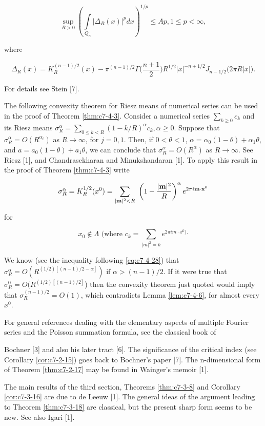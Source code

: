\[
\sup_{R>0}\left(\int\limits_{Q_{n}}\left|\Delta_{R}(x)\right|^{p} dx\right)^{1/p}\leq A p,1\leq p<\infty,
\]

where

\[
\Delta_{R}(x)=K_{R}^{(n-1)/2}(x)-\pi^{(n-1)/2}\Gamma\biggl(\frac{n+1}{2}\biggr)R^{1/2}\big|x\big|^{-n+1/2}J_{n-1/2}(2\pi R|x|\big).
\]

For details see Stein [7].

 The following convexity theorem for Riesz means of numerical series can be used in the proof of Theorem \ref{thm:c7-4-3}. Consider a numerical series $\sum_{k \geq 0} c_k$ and its Riesz means $\sigma_R^\alpha = \sum_{0 \leq k < R} (1 - k/R)^\alpha c_k, \alpha \geq 0$. Suppose that $\sigma_R^\alpha = O(R^{\alpha_t})$ as $R \to \infty$, for $j = 0, 1$. Then, if $0 < \theta < 1$, $\alpha = \alpha_0(1 - \theta) + \alpha_1\theta$, and $a = a_0(1 - \theta) + a_1\theta$, we can conclude that $\sigma_R^\alpha = O(R^\alpha)$ as $R \to \infty$. See Riesz [1], and Chandrasekharan and Minukshandaran [1]. To apply this result in the proof of Theorem \ref{thm:c7-4-3} write

\[
\sigma_{R}^{\alpha}=K_{R}^{1/2}(x^{0})=\sum_{|{\bf m}|^{2}<R}\ \left(1-\frac{|{\bf m}|^{2}}{R}\right)^{\alpha}e^{2\pi i{\bf m}\cdot{\bf x}^{0}}
\]

for

\[
x_{0}\notin\Lambda\text{ (where }c_{k}=\sum_{|m|^{2}=k}e^{2\pi i m\cdot x^{0}).}
\]

We know (see the inequality following \eqref{eq:c7-4-28}) that $\sigma_R^\alpha = O(R^{(1/2)[(n-1)/2-\alpha]})$ if $\alpha > (n-1)/2$. If it were true that $\sigma_R^0 = O(R^{(1/2)[(n-1)/2]}$) then the convexity theorem just quoted would imply that $\sigma_R^{(n-1)/2} = O(1)$, which contradicts Lemma \ref{lem:c7-4-6}, for almost every $x^0$.

\bibnoteshead

For general references dealing with the elementary aspects of multiple Fourier series and the Poisson summation formula, see the classical book of

Bochner [3] and also his later tract [6]. The significance of the critical index (see Corollary \ref{cor:c7-2-15}) goes back to Bochner's paper [7]. The n-dimensional form of Theorem \ref{thm:c7-2-17} may be found in Wainger's memoir [1].

The main results of the third section, Theorems \ref{thm:c7-3-8} and Corollary \ref{cor:c7-3-16} are due to de Leeuw [1]. The general ideas of the argument leading to Theorem \ref{thm:c7-3-18} are classical, but the present sharp form seems to be new. See also Igari [1].


